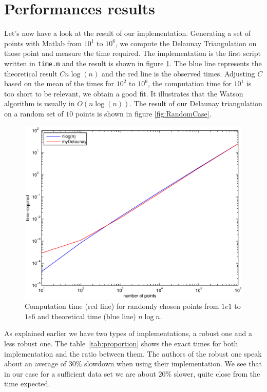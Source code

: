 \section{Performances results}

Let's now have a look at the result of our implementation. Generating a set of points with Matlab from $10^1$ to $10^6$, we compute the Delaunay Triangulation on those point and measure the time required. The implementation is the first script written in \texttt{time.m} and the result is shown in figure \ref{fig:timeRandom}. The blue line represents the theoretical result $C n\log(n)$ and the red line is the observed times. Adjusting $C$ based on the mean of the times for $10^2$ to $10^6$, the computation time for $10^1$ is too short to be relevant, we obtain a good fit. It illustrates that the Watson algorithm is usually in $O(n\log(n))$. The result of our Delaunay triangulation on a random set of $10$ points is shown in figure \ref{fig:RandomCase}. 

\begin{figure}
\centering 
\includegraphics[scale=0.5]{images/timeRandom.eps}
\caption{Computation time (red line) for randomly chosen points from $1e1$ to $1e6$ and theoretical time (blue line) $n\log n$.}
\label{fig:timeRandom}
\end{figure}

As explained earlier we have two types of implementations, a robust one and a less robust one. The table~\ref{tab:proportion} shows the exact times for both implementation and the ratio between them. The authors of the robust one speak about an average of $30\%$ slowdown when using their implementation. We see that in our case for a sufficient data set we are about $20\%$ slower, quite close from the time expected. 


